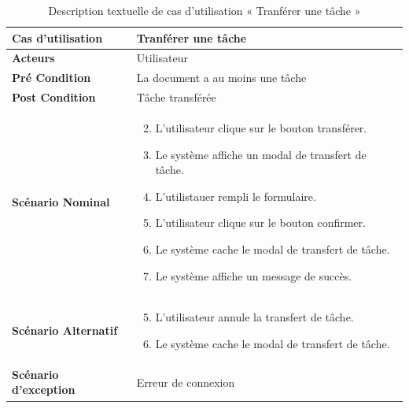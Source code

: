 \begin{longtable}{|p{5cm}|p{10cm}|}
  \caption{Description textuelle de cas d'utilisation « Tranférer une tâche »} \label{tab:DescriptionTextuelleDeCasDUtilisationTranfererUneTache} \\

\hline
\textbf{Cas d'utilisation}&Tranférer une tâche\\
\hline
\textbf{Acteurs}&Utilisateur\\
\hline
\textbf{Pré Condition}&La document a au moins une tâche\\
\hline
\textbf{Post Condition}&Tâche transférée\\
\hline
\textbf{Scénario Nominal}&
\vspace{-\baselineskip}
\begin{enumerate}
    \setcounter{enumi}{1}
    \item L'utilisateur clique sur le bouton transférer.
    \item Le système affiche un modal de transfert de tâche.
    \item L'utilistauer rempli le formulaire.
    \item L'utilisateur clique sur le bouton confirmer.
    \item Le système cache le modal de transfert de tâche.
    \item Le système affiche un message de succès.
\end{enumerate}\\
\hline
\textbf{Scénario Alternatif}&
\vspace{-\baselineskip}
\begin{enumerate}
    \setcounter{enumi}{4}
    \item L'utilisateur annule la transfert de tâche.
    \item Le système cache le modal de transfert de tâche.
\end{enumerate}\\
\hline
\textbf{Scénario d'exception}&Erreur de connexion\\
\hline
\end{longtable}


